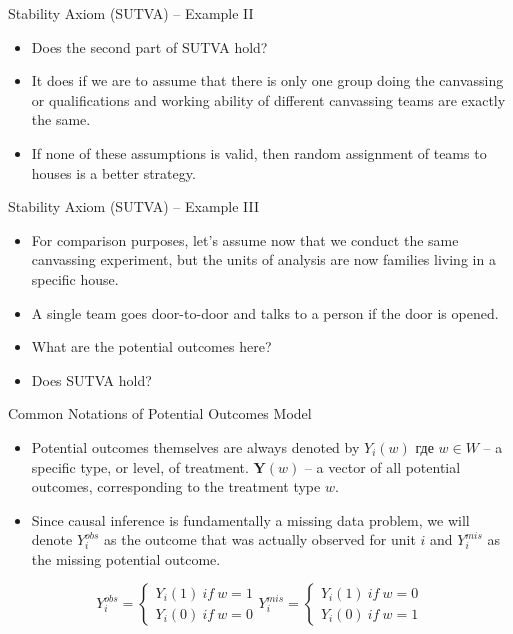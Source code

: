 \documentclass{beamer}
\begin{document}
\begin{frame}{Stability Axiom (SUTVA) -- Example II}
\begin{itemize}
	\setlength\itemsep{2em}
	\item Does the second part of SUTVA hold? 
	\item It does if we are to assume that there is only one group doing the canvassing or qualifications and working ability of different canvassing teams are exactly the same. 
	\item If none of these assumptions is valid, then random assignment of teams to houses is a better strategy. 
\end{itemize}
\end{frame}
\begin{frame}{Stability Axiom (SUTVA) -- Example III}
\begin{itemize}
	\setlength\itemsep{1em}
	\item For comparison purposes, let's assume now that we conduct the same canvassing experiment, but the units of analysis are now families living in a specific house. 
	\item A single team goes door-to-door and talks to a person if the door is opened. 
	\item What are the potential outcomes here?
	\item Does SUTVA hold? 
\end{itemize}
\end{frame}
\begin{frame}{Common Notations of Potential Outcomes Model}
\begin{itemize}
	\item Potential outcomes themselves are always denoted by $Y_i(w)$ где $w \in W$ -- a specific type, or level, of treatment. $\mathbf{Y}(w)$ -- a vector of all potential outcomes, corresponding to the treatment type $w$. 
	\item Since causal inference is fundamentally a missing data problem, we will denote $Y_i^{obs}$ as the outcome that was actually observed for unit $i$ and $Y_i^{mis}$ as the missing potential outcome.
\end{itemize}
\begin{equation*}
Y_i^{obs} = 
\begin{cases}
Y_i(1) \ if \ w = 1 \\
Y_i(0) \ if \ w = 0
\end{cases}
Y_i^{mis} = 
\begin{cases}
Y_i(1) \ if \ w = 0 \\
Y_i(0) \ if \ w = 1
\end{cases}
\end{equation*}
\end{frame}
\end{document}
